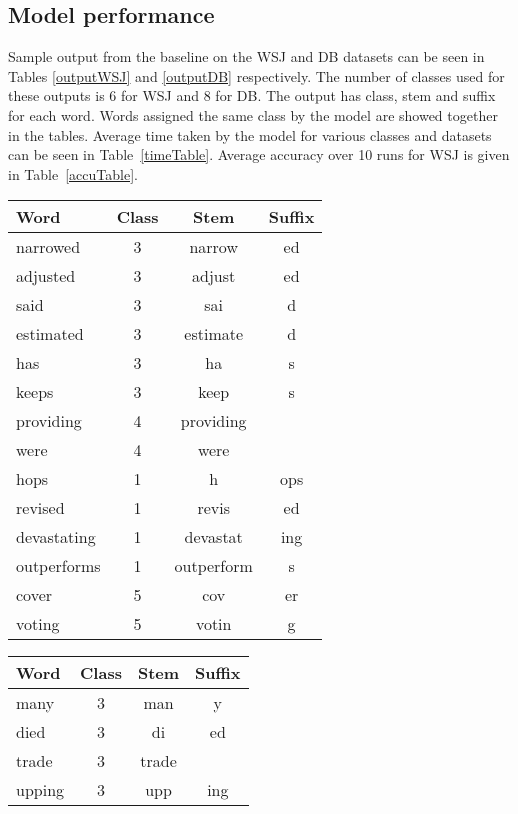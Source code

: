 \documentclass{article}
\begin{document}
\subsection{Model performance}

Sample output from the baseline on the WSJ and DB datasets can be seen 
in Tables \ref{outputWSJ} and \ref{outputDB} respectively. The number 
of classes used for these outputs is 6 for WSJ and 8 for DB. The output
 has class, stem and suffix for each word. Words assigned the same class
 by the model are showed together in the tables. Average time taken by 
the model for various classes and datasets can be seen in 
Table~\ref{timeTable}. Average accuracy over 10 runs for WSJ is given 
in Table~\ref{accuTable}.


\begin{table*}[ht]
\begin{minipage}[b]{0.5\linewidth}\centering
\begin{tabular}{lccc}
\hline
Word & Class & Stem & Suffix \\
\hline
narrowed&3&narrow&ed \\
adjusted&3&adjust&ed \\
said&3&sai&d \\
estimated&3&estimate&d \\
has&3&ha&s \\
keeps&3&keep&s \\
providing & 4 & providing & \\
were&4&were& \\
hops&1&h&ops \\ 
revised&1&revis&ed \\
devastating&1&devastat&ing\\
outperforms&1&outperform&s\\
cover&5&cov&er \\
voting&5&votin&g \\
\hline
 \end{tabular}
\caption{\label{outputWSJ} Sample output from WSJ}
\end{minipage}
\begin{minipage}[b]{0.5\linewidth}\centering
\begin{tabular}{lccc}
\hline
  Word & Class & Stem & Suffix \\
\hline
many & 3 & man & y \\
died & 3 & di & ed \\
trade & 3 & trade &  \\
upping & 3 & upp & ing \\

\end{tabular}
\end{minipage}
\end{table*}
\end{document}
